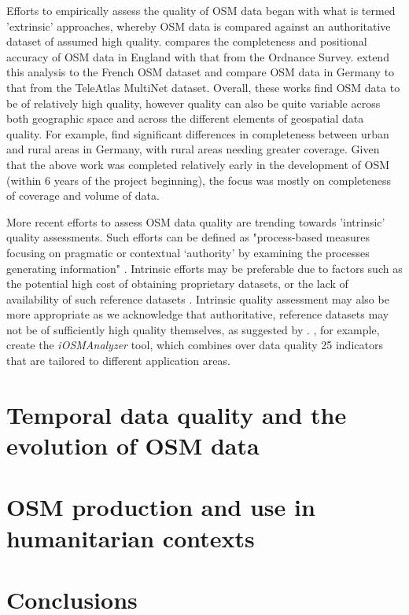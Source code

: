 Efforts to empirically assess the quality of OSM data began with what is termed 'extrinsic' approaches, whereby OSM data is compared against an authoritative dataset of assumed high quality. \textcite{haklay_how_2010} compares the completeness and positional accuracy of OSM data in England with that from the Ordnance Survey. \textcite{girres_quality_2010} extend this analysis to the French OSM dataset and \textcite{zielstra_comparative_2010} compare OSM data in Germany to that from the TeleAtlas MultiNet dataset. Overall, these works find OSM data to be of relatively high quality, however quality can also be quite variable across both geographic space and across the different elements of geospatial data quality. For example, \textcite{zielstra_comparative_2010} find significant differences in completeness between urban and rural areas in Germany, with rural areas needing greater coverage. Given that the above work was completed relatively early in the development of OSM (within 6 years of the project beginning), the focus was mostly on completeness of coverage and volume of data.  

More recent efforts to assess OSM data quality are trending towards 'intrinsic' quality assessments. Such efforts can be defined as "process-based measures focusing on pragmatic or contextual ‘authority’ by examining the processes generating information" \parencite[p. 297]{anderson_crowd_2018}. Intrinsic efforts may be preferable due to factors such as the potential high cost of obtaining proprietary datasets, or the lack of availability of such reference datasets \parencite{estes_maps_1994}. Intrinsic quality assessment may also be more appropriate as we acknowledge that authoritative, reference datasets may not be of sufficiently high quality themselves, as suggested by \textcite[p. 112]{goodchild_assuring_2012}. \textcite{barron_comprehensive_2014}, for example, create the \textit{iOSMAnalyzer} tool, which combines over data quality 25 indicators that are tailored to different application areas. 

\section{Temporal data quality and the evolution of OSM data}
\section{OSM production and use in humanitarian contexts}
\section{Conclusions}

